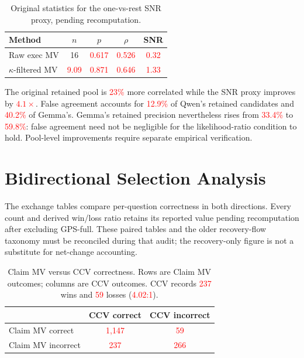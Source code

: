\documentclass{article}
\newcommand{\recheck}[1]{\textcolor{red}{#1}}
\begin{document}
\begin{table}[h]
\centering
\caption{Original statistics for the one-vs-rest SNR proxy, pending recomputation.}
\label{tab:numerical-snr}
\small
\begin{tabular}{lcccc}
\toprule
Method & $n$ & $p$ & $\rho$ & SNR \\
\midrule
Raw exec MV & 16 & \recheck{0.617} & \recheck{0.526} & \recheck{0.32} \\
$\kappa$-filtered MV & \recheck{9.09} & \recheck{0.871} & \recheck{0.646} & \recheck{1.33} \\
\bottomrule
\end{tabular}
\end{table}

The original retained pool is \recheck{23\%} more correlated while the SNR proxy improves by \recheck{$4.1\times$}. False agreement accounts for \recheck{12.9\%} of Qwen's retained candidates and \recheck{40.2\%} of Gemma's. Gemma's retained precision nevertheless rises from \recheck{33.4\%} to \recheck{59.8\%}: false agreement need not be negligible for the likelihood-ratio condition to hold. Pool-level improvements require separate empirical verification.

\section{Bidirectional Selection Analysis}
\label{app:regressions}

The exchange tables compare per-question correctness in both directions. Every count and derived win/loss ratio retains its reported value pending recomputation after excluding GPS-full. These paired tables and the older recovery-flow taxonomy must be reconciled during that audit; the recovery-only figure is not a substitute for net-change accounting.

\begin{table}[h]
\centering
\caption{Claim MV versus CCV correctness. Rows are Claim MV outcomes; columns are CCV outcomes. CCV records \recheck{237} wins and \recheck{59} losses (\recheck{4.02:1}).}
\label{tab:exchange-claim}
\small
\begin{tabular}{lcc}
\toprule
 & CCV correct & CCV incorrect \\
\midrule
Claim MV correct & \recheck{1,147} & \recheck{59} \\
Claim MV incorrect & \recheck{237} & \recheck{266} \\
\bottomrule
\end{tabular}
\end{table}
\end{document}
